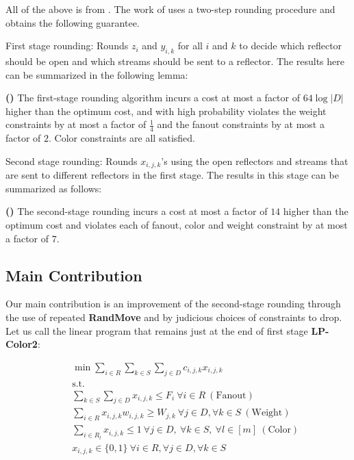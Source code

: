 All of the above is from \cite{DBLP:conf/spaa/AndreevMMS03}.
The work of \cite{DBLP:conf/spaa/AndreevMMS03} uses a two-step rounding procedure and obtains the following guarantee.

First stage rounding: Rounds $z_{i}$ and $y_{i,k}$ for all $i$ and $k$ to decide which reflector should be open and which streams should be sent to a reflector. The results here can be summarized in the following
lemma:

\begin{lemma}
\textbf{(\cite{DBLP:conf/spaa/AndreevMMS03})}
\label{lem:spaa1}
The first-stage rounding algorithm incurs a cost at most a factor of $64\log{|D|}$ higher than the optimum cost, and with high probability violates the weight constraints by at most a factor of $\frac{1}{4}$ and the fanout constraints by at most a factor of $2$. Color constraints are all satisfied.
\end{lemma}




Second stage rounding: Rounds $x_{i,j,k}$'s using the open reflectors and streams that are sent to different reflectors in the first stage. The results in this stage can be summarized as follows:

\begin{lemma}
\textbf{(\cite{DBLP:conf/spaa/AndreevMMS03})}
\label{lem:spaa2}
The second-stage rounding incurs a cost at most a factor of $14$ higher than the optimum cost and violates each of fanout, color and weight constraint by at most a factor of $7$.
\end{lemma}

\subsection{Main Contribution}

Our main contribution is an improvement of the second-stage rounding
through the use of repeated \textbf{RandMove} and by judicious choices of
constraints to drop. Let us call the linear program that remains just at the end of first stage \textbf{LP-Color2}:

\begin{eqnarray*}
&&\min{\sum_{i \in R}\sum_{k \in S}\sum_{j \in D} c_{i,j,k}x_{i,j,k}}\\
&& \text{s.t.}\\
&& \sum_{k \in S}\sum_{j \in D}x_{i,j,k} \leq F_{i}~\forall i \in R ~(\text{Fanout})\\
&& \sum_{i \in R}x_{i,j,k}w_{i,j,k} \geq W_{j,k}~\forall j \in D, \forall k \in S ~(\text{Weight})\\
&& \sum_{i \in R_{l}} x_{i,j,k} \leq 1~\forall j \in D, ~\forall k \in S, ~\forall l \in [m]~(\text{Color})\\
&& x_{i,j,k} \in \{0,1\} ~\forall i \in R,\forall j \in D, \forall k \in S\\
\end{eqnarray*}

